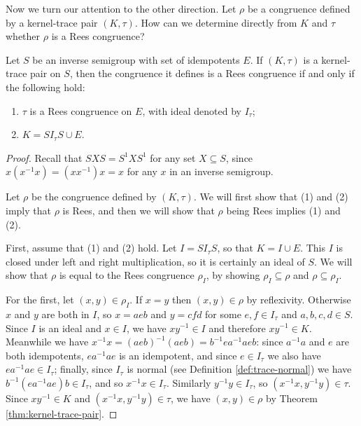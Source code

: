 Now we turn our attention to the other direction.  Let $\rho$ be a congruence
defined by a kernel-trace pair $(K, \tau)$.  How can we determine directly from
$K$ and $\tau$ whether $\rho$ is a Rees congruence?

\begin{theorem}
  \label{thm:kertr-to-rees}
  Let $S$ be an inverse semigroup with set of idempotents $E$.  If $(K, \tau)$
  is a kernel-trace pair on $S$, then the congruence it defines is a Rees
  congruence if and only if the following hold:
  \begin{enumerate}[\rm(1)]
  \item $\tau$ is a Rees congruence on $E$, with ideal denoted by $I_\tau$;
  \item $K = S I_\tau S \cup E$.
  \end{enumerate}
  \begin{proof}
    Recall that $SXS = S^1XS^1$ for any set $X \subseteq S$, since
    $x(x^{-1}x)=(xx^{-1})x=x$ for any $x$ in an inverse semigroup.

    Let $\rho$ be the congruence defined by $(K, \tau)$.  We will first show
    that (1) and (2) imply that $\rho$ is Rees, and then we will show that
    $\rho$ being Rees implies (1) and (2).

    First, assume that (1) and (2) hold.  Let $I = S I_\tau S$, so that
    $K = I \cup E$.  This $I$ is closed under left and right multiplication, so
    it is certainly an ideal of $S$.  We will show that $\rho$ is equal to the
    Rees congruence $\rho_I$, by showing $\rho_I \subseteq \rho$ and
    $\rho \subseteq \rho_I$.

    For the first, let $(x,y) \in \rho_I$.  If $x=y$ then $(x,y) \in \rho$ by
    reflexivity.  Otherwise $x$ and $y$ are both in $I$, so $x = aeb$ and
    $y=cfd$ for some $e,f \in I_\tau$ and $a,b,c,d \in S$.  Since $I$ is an
    ideal and $x \in I$, we have $xy^{-1} \in I$ and therefore $xy^{-1} \in K$.
    Meanwhile we have $x^{-1}x = (aeb)^{-1}(aeb) = b^{-1}ea^{-1}aeb$: since
    $a^{-1}a$ and $e$ are both idempotents, $ea^{-1}ae$ is an idempotent, and
    since $e \in I_\tau$ we also have $ea^{-1}ae \in I_\tau$; finally, since
    $I_\tau$ is normal (see Definition \ref{def:trace-normal}) we have
    $b^{-1}(ea^{-1}ae)b \in I_\tau$, and so $x^{-1}x \in I_\tau$.  Similarly
    $y^{-1}y \in I_\tau$, so $(x^{-1}x, y^{-1}y) \in \tau$.  Since
    $xy^{-1} \in K$ and $(x^{-1}x, y^{-1}y) \in \tau$, we have $(x,y) \in \rho$
    by Theorem \ref{thm:kernel-trace-pair}.


\end{proof}
\end{theorem}
